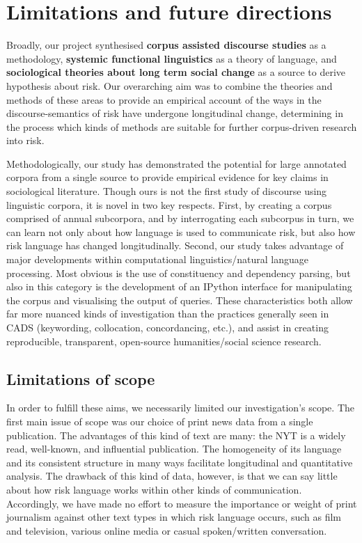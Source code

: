 
\chapter{Limitations and future directions}

Broadly, our project synthesised \textbf{corpus assisted discourse studies} as a methodology, \textbf{systemic functional linguistics} as a theory of language, and \textbf{sociological theories about long term social change} as a source to derive hypothesis about risk. Our overarching aim was to combine the theories and methods of these areas to provide an empirical account of the ways in the discourse-semantics of risk have undergone longitudinal change, determining in the process which kinds of methods are suitable for further corpus-driven research into risk.

Methodologically, our study has demonstrated the potential for large annotated corpora from a single source to provide empirical evidence for key claims in sociological literature. Though ours is not the first study of discourse using linguistic corpora, it is novel in two key respects. First, by creating a corpus comprised of annual subcorpora, and by interrogating each subcorpus in turn, we can learn not only about how language is used to communicate risk, but also how risk language has changed longitudinally. Second, our study takes advantage of major developments within computational linguistics\slash natural language processing. Most obvious is the use of constituency and dependency parsing, but also in this category is the development of an IPython interface for manipulating the corpus and visualising the output of queries. These characteristics both allow far more nuanced kinds of investigation than the practices generally seen in CADS (keywording, collocation, concordancing, etc.), and assist in creating reproducible, transparent, open-source humanities\slash social science research.

\section{Limitations of scope}

In order to fulfill these aims, we necessarily limited our investigation's scope. The first main issue of scope was our choice of print news data from a single publication. The advantages of this kind of text are many: the NYT is a widely read, well-known, and influential publication. The homogeneity of its language and its consistent structure in many ways facilitate longitudinal and quantitative analysis. The drawback of this kind of data, however, is that we can say little about how risk language works within other kinds of communication. Accordingly, we have made no effort to measure the importance or weight of print journalism against other text types in which risk language occurs, such as film and television, various online media or casual spoken\slash written conversation.

